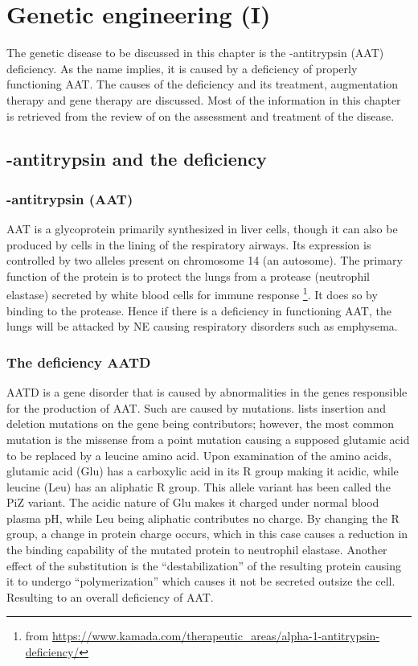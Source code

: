 \chapter{Genetic engineering (I)}

The genetic disease to be discussed in this chapter is the -antitrypsin (AAT) deficiency.
As the name implies, it is caused by a deficiency of properly functioning AAT.
The causes of the deficiency and its treatment, augmentation therapy and gene therapy are discussed.
Most of the information in this chapter is retrieved from the review of  on the assessment and treatment of the disease.

\section{-antitrypsin and the deficiency}
\subsection{-antitrypsin (AAT)}
AAT is a glycoprotein primarily synthesized in liver cells, though it can also be produced by cells in the lining of the respiratory airways.
Its expression is controlled by two alleles present on chromosome 14 (an autosome).
The primary function of the protein is to protect the lungs from a protease (neutrophil elastase) secreted by white blood cells for immune response
\footnote{from \url{https://www.kamada.com/therapeutic_areas/alpha-1-antitrypsin-deficiency/}}.
It does so by binding to the protease.
Hence if there is a deficiency in functioning AAT, the lungs will be attacked by NE causing respiratory disorders such as emphysema.

\subsection{The deficiency AATD}
AATD is a gene disorder that is caused by abnormalities in the genes responsible for the production of AAT.
Such are caused by mutations.
 lists insertion and deletion mutations on the gene being contributors; however, the most common mutation is the missense from a point mutation causing a supposed glutamic acid to be replaced by a leucine amino acid.
Upon examination of the amino acids, glutamic acid (Glu) has a carboxylic acid in its R group making it acidic, while leucine (Leu) has an aliphatic R group.
This allele variant has been called the PiZ variant.
The acidic nature of Glu makes it charged under normal blood plasma pH, while Leu being aliphatic contributes no charge.
By changing the R group, a change in protein charge occurs, which in this case causes a reduction in the binding capability of the mutated protein to neutrophil elastase.
Another effect of the substitution is the ``destabilization'' of the resulting protein causing it to undergo ``polymerization'' which causes it not be secreted outsize the cell.
Resulting to an overall deficiency of AAT.

